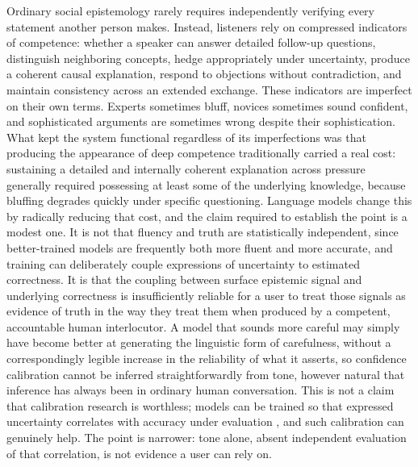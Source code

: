 \documentclass[11pt]{article}
\begin{document}
Ordinary social epistemology rarely requires independently verifying every statement another person makes. Instead, listeners rely on compressed indicators of competence: whether a speaker can answer detailed follow-up questions, distinguish neighboring concepts, hedge appropriately under uncertainty, produce a coherent causal explanation, respond to objections without contradiction, and maintain consistency across an extended exchange. These indicators are imperfect on their own terms. Experts sometimes bluff, novices sometimes sound confident, and sophisticated arguments are sometimes wrong despite their sophistication. What kept the system functional regardless of its imperfections was that producing the appearance of deep competence traditionally carried a real cost: sustaining a detailed and internally coherent explanation across pressure generally required possessing at least some of the underlying knowledge, because bluffing degrades quickly under specific questioning. Language models change this by radically reducing that cost, and the claim required to establish the point is a modest one. It is not that fluency and truth are statistically independent, since better-trained models are frequently both more fluent and more accurate, and training can deliberately couple expressions of uncertainty to estimated correctness. It is that the coupling between surface epistemic signal and underlying correctness is insufficiently reliable for a user to treat those signals as evidence of truth in the way they treat them when produced by a competent, accountable human interlocutor. A model that sounds more careful may simply have become better at generating the linguistic form of carefulness, without a correspondingly legible increase in the reliability of what it asserts, so confidence calibration cannot be inferred straightforwardly from tone, however natural that inference has always been in ordinary human conversation. This is not a claim that calibration research is worthless; models can be trained so that expressed uncertainty correlates with accuracy under evaluation \cite{guo2017}, and such calibration can genuinely help. The point is narrower: tone alone, absent independent evaluation of that correlation, is not evidence a user can rely on.
\end{document}
